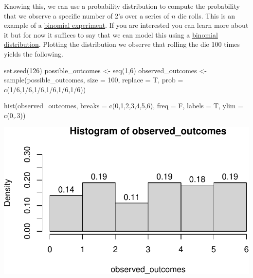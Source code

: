 \documentclass[
  letterpaper,
  DIV=11,
  numbers=noendperiod]{scrartcl}
\newenvironment{Shaded}{\begin{snugshade}}{\end{snugshade}}
\newcommand{\AttributeTok}[1]{\textcolor[rgb]{0.40,0.45,0.13}{#1}}
\newcommand{\DecValTok}[1]{\textcolor[rgb]{0.68,0.00,0.00}{#1}}
\newcommand{\FunctionTok}[1]{\textcolor[rgb]{0.28,0.35,0.67}{#1}}
\newcommand{\NormalTok}[1]{\textcolor[rgb]{0.00,0.23,0.31}{#1}}
\newcommand{\OtherTok}[1]{\textcolor[rgb]{0.00,0.23,0.31}{#1}}
\newcommand{\SpecialCharTok}[1]{\textcolor[rgb]{0.37,0.37,0.37}{#1}}
\begin{document}
Knowing this, we can use a probability distribution to compute the
probability that we observe a specific number of 2's over a series of
\(n\) die rolls. This is an example of a
\href{https://www.statisticshowto.com/probability-and-statistics/binomial-theorem/binomial-experiment/}{binomial
experiment}. If you are interested you can learn more about it but for
now it suffices to say that we can model this using a
\href{https://en.wikipedia.org/wiki/Binomial_distribution}{binomial
distribution}. Plotting the distribution we observe that rolling the die
100 times yields the following.

\begin{Shaded}
\begin{Highlighting}[]
\FunctionTok{set.seed}\NormalTok{(}\DecValTok{126}\NormalTok{)}
\NormalTok{possible\_outcomes }\OtherTok{\textless{}{-}} \FunctionTok{seq}\NormalTok{(}\DecValTok{1}\NormalTok{,}\DecValTok{6}\NormalTok{)}
\NormalTok{observed\_outcomes }\OtherTok{\textless{}{-}} \FunctionTok{sample}\NormalTok{(possible\_outcomes, }\AttributeTok{size =} \DecValTok{100}\NormalTok{, }
                            \AttributeTok{replace =}\NormalTok{ T, }\AttributeTok{prob =} \FunctionTok{c}\NormalTok{(}\DecValTok{1}\SpecialCharTok{/}\DecValTok{6}\NormalTok{,}\DecValTok{1}\SpecialCharTok{/}\DecValTok{6}\NormalTok{,}\DecValTok{1}\SpecialCharTok{/}\DecValTok{6}\NormalTok{,}\DecValTok{1}\SpecialCharTok{/}\DecValTok{6}\NormalTok{,}\DecValTok{1}\SpecialCharTok{/}\DecValTok{6}\NormalTok{,}\DecValTok{1}\SpecialCharTok{/}\DecValTok{6}\NormalTok{))}

\FunctionTok{hist}\NormalTok{(observed\_outcomes, }\AttributeTok{breaks =} \FunctionTok{c}\NormalTok{(}\DecValTok{0}\NormalTok{,}\DecValTok{1}\NormalTok{,}\DecValTok{2}\NormalTok{,}\DecValTok{3}\NormalTok{,}\DecValTok{4}\NormalTok{,}\DecValTok{5}\NormalTok{,}\DecValTok{6}\NormalTok{), }\AttributeTok{freq =}\NormalTok{ F, }
     \AttributeTok{labels =}\NormalTok{ T, }\AttributeTok{ylim =} \FunctionTok{c}\NormalTok{(}\DecValTok{0}\NormalTok{,.}\DecValTok{3}\NormalTok{))}
\end{Highlighting}
\end{Shaded}

\includegraphics{stats_review_files/figure-pdf/unnamed-chunk-17-1.pdf}
\end{document}
